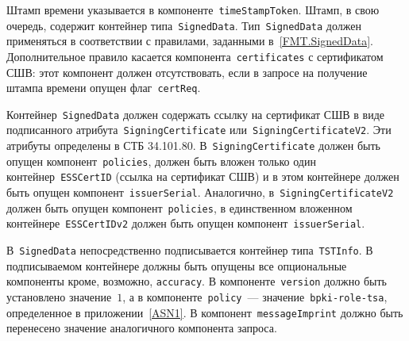 Штамп времени указывается в компоненте~\texttt{timeStampToken}. Штамп, в 
свою очередь, содержит контейнер типа~\texttt{SignedData}.
%
Тип~\texttt{SignedData} должен применяться в соответствии с правилами,
заданными в~\ref{FMT.SignedData}. Дополнительное правило  
касается компонента~\texttt{certificates} с сертификатом СШВ:
этот компонент должен отсутствовать, если в запросе на получение штампа 
времени опущен флаг~\texttt{certReq}.

Контейнер~\texttt{SignedData} должен содержать ссылку на сертификат СШВ
в виде подписанного атрибута~\texttt{SigningCertificate} 
или~\texttt{SigningCertificateV2}. Эти атрибуты определены в СТБ 
34.101.80.  
%
В~\texttt{SigningCertificate} должен быть опущен 
компонент~\texttt{policies}, должен быть вложен только один 
контейнер~\texttt{ESSCertID} (ссылка на сертификат СШВ) и в этом 
контейнере должен быть опущен компонент~\texttt{issuerSerial}.
%
Аналогично, в~\texttt{SigningCertificateV2} должен быть опущен 
компонент~\texttt{policies}, в единственном вложенном 
контейнере~\texttt{ESSCertIDv2} должен быть опущен 
компонент~\texttt{issuerSerial}.

В~\texttt{SignedData} непосредственно подписывается 
контейнер типа~\texttt{TSTInfo}. 
%
В подписываемом контейнере должны быть опущены все опциональные компоненты 
кроме, возможно, \texttt{accuracy}. 
%
В компоненте~\texttt{version} должно быть установлено значение~$1$,
а в компоненте~\texttt{policy}~--- значение~\texttt{bpki-role-tsa},
определенное в приложении~\ref{ASN1}.
%
В компонент~\texttt{messageImprint} должно быть перенесено
значение аналогичного компонента запроса.

